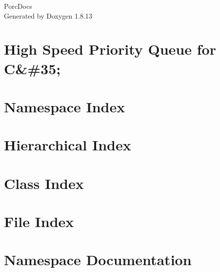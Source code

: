 \documentclass[twoside]{book}
\newcommand{\+}{\discretionary{\mbox{\scriptsize$\hookleftarrow$}}{}{}}
\newcommand{\clearemptydoublepage}{%
  \newpage{\pagestyle{empty}\cleardoublepage}%
}
\begin{document}
\hypersetup{pageanchor=false,
             bookmarksnumbered=true,
             pdfencoding=unicode
            }
\begin{titlepage}
\vspace*{7cm}
\begin{center}%
{\Large Porc\+Docs }\\
\vspace*{1cm}
{\large Generated by Doxygen 1.8.13}\\
\end{center}
\end{titlepage}
\clearemptydoublepage
{}
\tableofcontents
\clearemptydoublepage
{}
\hypersetup{pageanchor=true}

\chapter{High Speed Priority Queue for C\&\#35;}
\label{md__g_1__workspace__porcupine__project_porcupine__assets__scripts__utilities__priority__queue__r_e_a_d_m_e}

\chapter{Namespace Index}

\chapter{Hierarchical Index}

\chapter{Class Index}

\chapter{File Index}

\chapter{Namespace Documentation}
















\end{document}

